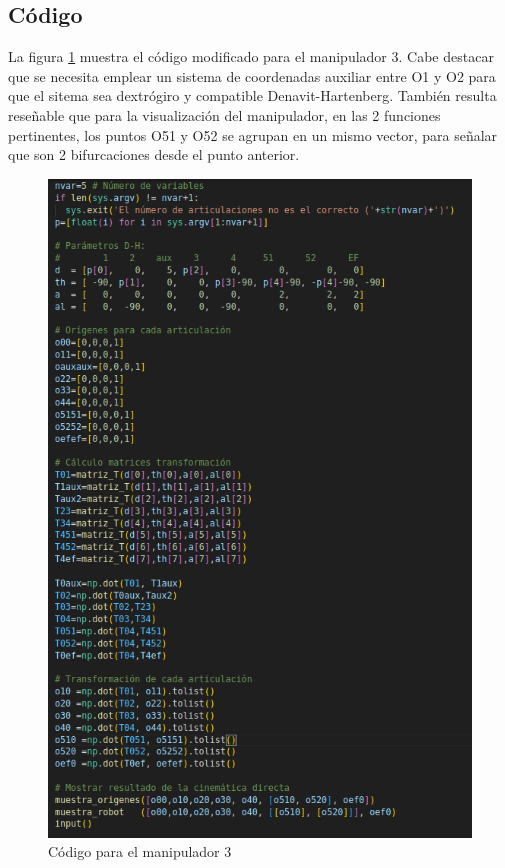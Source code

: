 \subsection{Código}
La figura \ref{chapter:codigo2} muestra el código modificado para el manipulador 3.
Cabe destacar que se necesita emplear un sistema de coordenadas auxiliar entre O1 y O2 para que el sitema sea dextrógiro y compatible Denavit-Hartenberg.
También resulta reseñable que para la visualización del manipulador, en las 2 funciones pertinentes, los puntos O51 y O52 se agrupan en un mismo vector, para señalar que son 2 bifurcaciones desde el punto anterior. 
\begin{figure}[htb]
   \centering
   \includegraphics[width=0.8\linewidth]{images/cin_dir_3.png}
   \caption{Código para el manipulador 3}
   \label{chapter:codigo2}
\end{figure}

